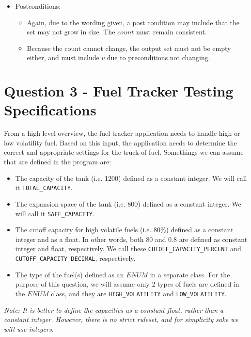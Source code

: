 \documentclass{article}
\begin{document}
\begin{enumerate}
\begin{itemize}
\begin{itemize}
        \end{itemize}
        \item Postconditions:
        \begin{itemize}
            \item Again, due to the wording given, a post condition may include that the set may not grow in size. The $count$ must remain consistent.
            \item Because the count cannot change, the output set must not be empty either, and must include $v$ due to preconditions not changing.
        \end{itemize}
    \end{itemize}
\end{enumerate}

\newpage

\section*{Question 3 - Fuel Tracker Testing Specifications}

From a high level overview, the fuel tracker application needs to handle high or low volatility fuel. Based on this input, the application needs to determine the correct and appropriate settings for the truck of fuel. Somethings we can assume that are defined in the program are:

\begin{itemize}
    \item The capacity of the tank (i.e. 1200) defined as a constant integer. We will call it \texttt{TOTAL\_CAPACITY}.
    \item The expansion space of the tank (i.e. 800) defined as a constant integer. We will call it \texttt{SAFE\_CAPACITY}.
    \item The cutoff capacity for high volatile fuels (i.e. 80\%) defined as a constant integer and as a float. In other words, both 80 and 0.8 are defined as constant integer and float, respectively. We call these \texttt{CUTOFF\_CAPACITY\_PERCENT} and \texttt{CUTOFF\_CAPACITY\_DECIMAL}, respectively.
    \item The type of the fuel(s) defined as an $ENUM$ in a separate class. For the purpose of this question, we will assume only 2 types of fuels are defined in the $ENUM$ class, and they are \texttt{HIGH\_VOLATILITY} and \texttt{LOW\_VOLATILITY}.
\end{itemize}

\textit{Note: It is better to define the capacities as a constant float, rather than a constant integer. However, there is no strict ruleset, and for simplicity sake we will use integers.} \\
\end{document}
